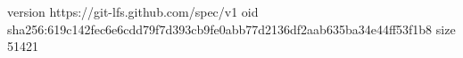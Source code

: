 version https://git-lfs.github.com/spec/v1
oid sha256:619c142fec6e6cdd79f7d393cb9fe0abb77d2136df2aab635ba34e44ff53f1b8
size 51421
